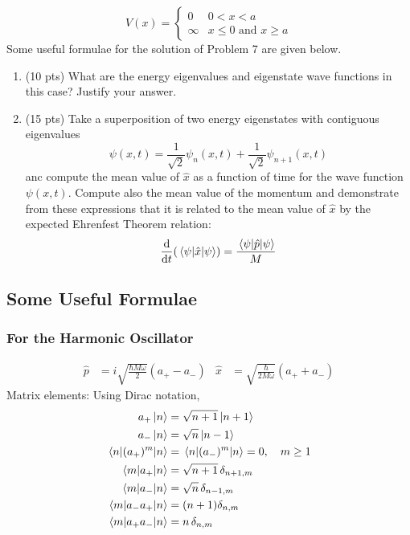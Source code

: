 \documentclass[../notes.tex]{subfiles}
\begin{document}
\begin{enumerate}[label={\textbf{\arabic*.}}]
    \begin{equation*}
        V(x) =
        \begin{cases}
            0 & 0<x<a\\
            \infty & x\leq 0\text{ and }x\geq a
        \end{cases}
    \end{equation*}
    Some useful formulae for the solution of Problem 7 are given below.
    \begin{enumerate}[label={\textbf{\alph*.}}]
        \item (10 pts) What are the energy eigenvalues and eigenstate wave functions in this case? Justify your answer.
        \item (15 pts) Take a superposition of two energy eigenstates with contiguous eigenvalues
        \begin{equation*}
            \psi(x,t) = \frac{1}{\sqrt{2}}\psi_n(x,t)+\frac{1}{\sqrt{2}}\psi_{n+1}(x,t)
        \end{equation*}
        anc compute the mean value of $\hat{x}$ as a function of time for the wave function $\psi(x,t)$. Compute also the mean value of the momentum and demonstrate from these expressions that it is related to the mean value of $\hat{x}$ by the expected Ehrenfest Theorem relation:
        \begin{equation*}
            \dv{t}(\ev{\hat{x}}{\psi}) = \frac{\ev{\hat{p}}{\psi}}{M}
        \end{equation*}
    \end{enumerate}
\end{enumerate}


\subsection*{Some Useful Formulae}
\subsubsection*{For the Harmonic Oscillator}
\begin{align*}
    \hat{p} &= i\sqrt{\frac{\hbar M\omega}{2}}(a_+-a_-)&
    \hat{x} &= \sqrt{\frac{\hbar}{2M\omega}}(a_++a_-)
\end{align*}
Matrix elements: Using Dirac notation,
\begin{align*}
    a_+\ket{n} &= \sqrt{n+1}\ket{n+1}\\
    a_-\ket{n} &= \sqrt{n}\ket{n-1}\\
    \ev{(a_+)^m}{n} &= \ev{(a_-)^m}{n} = 0,\quad m\geq 1\\
    \mel{m}{a_+}{n} &= \sqrt{n+1}\,\delta_{n+1,m}\\
    \mel{m}{a_-}{n} &= \sqrt{n}\,\delta_{n-1,m}\\
    \mel{m}{a_-a_+}{n} &= (n+1)\delta_{n,m}\\
    \mel{m}{a_+a_-}{n} &= n\,\delta_{n,m}
\end{align*}
\end{document}
